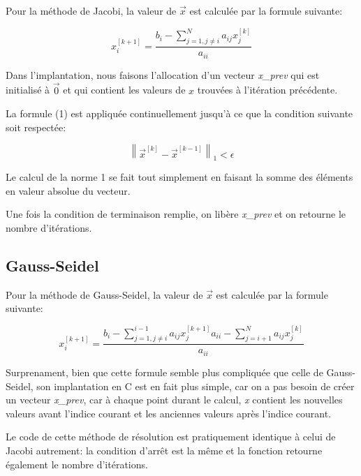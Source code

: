 \documentclass[10pt]{article}
\begin{document}
Pour la méthode de Jacobi, la valeur de $\vec{x}$ est calculée par la
formule suivante:

\[
x_i^{[k+1]} = \frac{b_i - \sum_{j=1, j \ne i}^N
  a_{ij}x_j^{[k]}}{a_{ii}} \tag{1}
\]

Dans l'implantation, nous faisons l'allocation d'un vecteur
\emph{x\_prev} qui est initialisé à $\vec{0}$ et qui contient les
valeurs de $x$ trouvées à l'itération précédente.

La formule (1) est appliquée continuellement jusqu'à ce que la
condition suivante soit respectée:

\[
\left\| \vec{x}^{[k]} - \vec{x}^{[k-1]} \right\|_1 < \epsilon
\]

Le calcul de la norme 1 se fait tout simplement en faisant la somme
des éléments en valeur absolue du vecteur.

Une fois la condition de terminaison remplie, on libère
\emph{x\_prev} et on retourne le nombre d'itérations.

\subsection{Gauss-Seidel}

Pour la méthode de Gauss-Seidel, la valeur de $\vec{x}$ est calculée
par la formule suivante:

\[
x_i^{[k+1]} = \frac{b_i - \sum_{j=1, j \ne i}^{i-1}
  a_{ij}x_j^{[k+1]}{a_{ii}} - \sum_{j=i+1}^{N}
  a_{ij}x_j^{[k]}}{a_{ii}}  \tag{2}
\]

Surprenament, bien que cette formule semble plus compliquée que celle
de Gauss-Seidel, son implantation en C est en fait plus simple, car on
a pas besoin de créer un vecteur \emph{x\_prev}, car à chaque
point durant le calcul, \emph{x} contient les nouvelles valeurs avant
l'indice courant et les anciennes valeurs après l'indice courant.

Le code de cette méthode de résolution est pratiquement identique à
celui de Jacobi autrement: la condition d'arrêt est la même et la
fonction retourne également le nombre d'itérations.
\end{document}
